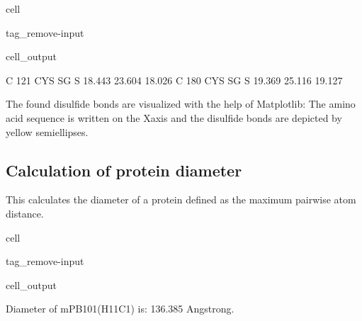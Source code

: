 \documentclass[letterpaper,10pt,english]{jupyterBook}
\begin{document}
\begin{sphinxuseclass}{cell}
\begin{sphinxuseclass}{tag_remove-input}\begin{sphinxVerbatimOutput}

\begin{sphinxuseclass}{cell_output}
\begin{sphinxVerbatim}[commandchars=\\\{\}]
    C     121  CYS SG     S       \PYGZhy{}18.443  \PYGZhy{}23.604  \PYGZhy{}18.026
    C     180  CYS SG     S       \PYGZhy{}19.369  \PYGZhy{}25.116  \PYGZhy{}19.127
\end{sphinxVerbatim}

\noindent{}

\end{sphinxuseclass}\end{sphinxVerbatimOutput}

\end{sphinxuseclass}
\end{sphinxuseclass}
\sphinxAtStartPar
The found disulfide bonds are visualized with the help of Matplotlib: The amino acid sequence is written on the X\sphinxhyphen{}axis and the disulfide bonds are depicted by yellow semi\sphinxhyphen{}ellipses.


\subsection{Calculation of protein diameter}
\label{\detokenize{ipynb/chapter1:calculation-of-protein-diameter}}
\sphinxAtStartPar
This calculates the diameter of a protein defined as the maximum pairwise atom distance.

\begin{sphinxuseclass}{cell}
\begin{sphinxuseclass}{tag_remove-input}\begin{sphinxVerbatimOutput}

\begin{sphinxuseclass}{cell_output}
\begin{sphinxVerbatim}[commandchars=\\\{\}]
\PYGZsh{} Diameter of mPB101(H\PYGZus{}11C1) is: \PYGZhy{}\PYGZhy{}\PYGZhy{}\PYGZhy{}\PYGZhy{}\PYGZhy{}\PYGZhy{}\PYGZhy{}\PYGZhy{}\PYGZhy{}\PYGZhy{}\PYGZhy{}\PYGZhy{}\PYGZhy{}\PYGZhy{}\PYGZhy{}\PYGZhy{}\PYGZhy{}\PYGZhy{}\PYGZhy{}\PYGZhy{}\PYGZhy{}\PYGZhy{}136.385 Angstrong.
\end{sphinxVerbatim}

\end{sphinxuseclass}\end{sphinxVerbatimOutput}

\end{sphinxuseclass}
\end{sphinxuseclass}
\end{document}
